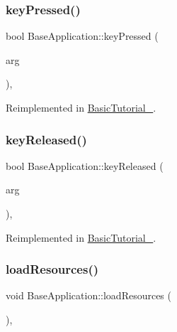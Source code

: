 \mbox{\label{class_base_application_acfa977f04e435f18018ece805c1277ec}} 
\subsubsection{\texorpdfstring{key\+Pressed()}{keyPressed()}}
{\footnotesize\ttfamily bool Base\+Application\+::key\+Pressed (\begin{DoxyParamCaption}\item[{const O\+I\+S\+::\+Key\+Event \&}]{arg }\end{DoxyParamCaption})\hspace{0.3cm}{\ttfamily [protected]}, {\ttfamily [virtual]}}



Reimplemented in \mbox{\hyperlink{class_basic_tutorial__00_adc1a0b32d78b1980b3ee51a1b1e1e69b}{Basic\+Tutorial\+\_}}.

\mbox{\label{class_base_application_aba5c7c9dea7a0efc58b89310bae547e5}} 
\subsubsection{\texorpdfstring{key\+Released()}{keyReleased()}}
{\footnotesize\ttfamily bool Base\+Application\+::key\+Released (\begin{DoxyParamCaption}\item[{const O\+I\+S\+::\+Key\+Event \&}]{arg }\end{DoxyParamCaption})\hspace{0.3cm}{\ttfamily [protected]}, {\ttfamily [virtual]}}



Reimplemented in \mbox{\hyperlink{class_basic_tutorial__00_aacca7a0a2a5a0e0d007b9c6c30b4941b}{Basic\+Tutorial\+\_}}.

\mbox{\label{class_base_application_aaeb764e637dd87601a81a80156659d88}} 
\subsubsection{\texorpdfstring{load\+Resources()}{loadResources()}}
{\footnotesize\ttfamily void Base\+Application\+::load\+Resources (\begin{DoxyParamCaption}\item[{void}]{ }\end{DoxyParamCaption})\hspace{0.3cm}{\ttfamily [protected]}, {\ttfamily [virtual]}}

